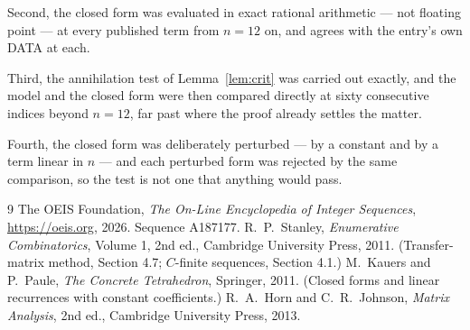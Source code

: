\documentclass[11pt,a4paper]{article}
\theoremstyle{plain}
\theoremstyle{definition}
\begin{document}
Second, the closed form was evaluated in exact rational arithmetic --- not floating point ---
at every published term from $n=12$ on, and agrees with the entry's own DATA at each.

Third, the annihilation test of Lemma~\ref{lem:crit} was carried out exactly, and the model
and the closed form were then compared directly at sixty consecutive indices beyond
$n=12$, far past where the proof already settles the matter.

Fourth, the closed form was deliberately perturbed --- by a constant and by a term linear in
$n$ --- and each perturbed form was rejected by the same comparison, so the test is not one
that anything would pass.

\begin{thebibliography}{9}
 The OEIS Foundation, \emph{The On-Line Encyclopedia of Integer
Sequences}, \url{https://oeis.org}, 2026. Sequence A187177.
 R.~P.~Stanley, \emph{Enumerative Combinatorics}, Volume 1, 2nd ed.,
Cambridge University Press, 2011. (Transfer-matrix method, Section 4.7; $C$-finite sequences,
Section 4.1.)
 M.~Kauers and P.~Paule, \emph{The Concrete Tetrahedron}, Springer, 2011.
(Closed forms and linear recurrences with constant coefficients.)
 R.~A.~Horn and C.~R.~Johnson, \emph{Matrix Analysis}, 2nd ed., Cambridge
University Press, 2013.
\end{thebibliography}
\end{document}
